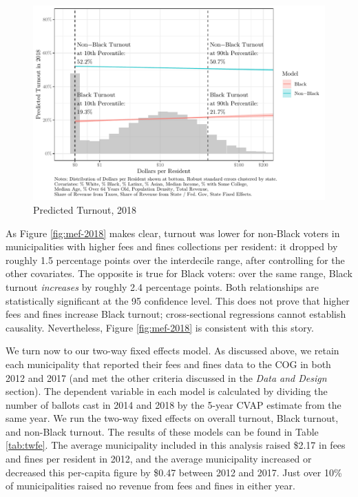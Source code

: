 \documentclass[
  12pt,
]{article}
\begin{document}
\begin{figure}[H]

{\centering \includegraphics{draft_paper_files/figure-latex/cross-18-1} 

}

\caption{\label{fig:mef-2018}Predicted Turnout, 2018}\label{fig:cross-18}
\end{figure}

As Figure \ref{fig:mef-2018} makes clear, turnout was lower for non-Black voters in municipalities with higher fees and fines collections per resident: it dropped by roughly 1.5 percentage points over the interdecile range, after controlling for the other covariates. The opposite is true for Black voters: over the same range, Black turnout \emph{increases} by roughly 2.4 percentage points. Both relationships are statistically significant at the 95 confidence level. This does not prove that higher fees and fines increase Black turnout; cross-sectional regressions cannot establish causality. Nevertheless, Figure \ref{fig:mef-2018} is consistent with this story.

We turn now to our two-way fixed effects model. As discussed above, we retain each municipality that reported their fees and fines data to the COG in both 2012 and 2017 (and met the other criteria discussed in the \emph{Data and Design} section). The dependent variable in each model is calculated by dividing the number of ballots cast in 2014 and 2018 by the 5-year CVAP estimate from the same year. We run the two-way fixed effects on overall turnout, Black turnout, and non-Black turnout. The results of these models can be found in Table \ref{tab:twfe}. The average municipality included in this analysis raised \$2.17 in fees and fines per resident in 2012, and the average municipality increased or decreased this per-capita figure by \$0.47 between 2012 and 2017. Just over 10\% of municipalities raised no revenue from fees and fines in either year.
\end{document}
